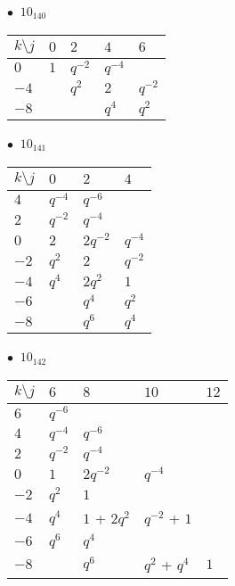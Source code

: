 %
\begin{minipage}{\linewidth}
$\bullet\ $ $10_{140}$ \vspace{0.5em} \\
\begin{tabular}{l|llll}
$k \setminus j$ & $0$ & $2$ & $4$ & $6$ \\
\hline
$0$ & $1$ & $q^{-2}$ & $q^{-4}$ &  \\
$-4$ &  & $q^{2}$ & $2$ & $q^{-2}$ \\
$-8$ &  &  & $q^{4}$ & $q^{2}$ \\
\end{tabular}
\vspace{2em}
\end{minipage}
%
\begin{minipage}{\linewidth}
$\bullet\ $ $10_{141}$ \vspace{0.5em} \\
\begin{tabular}{l|lll}
$k \setminus j$ & $0$ & $2$ & $4$ \\
\hline
$4$ & $q^{-4}$ & $q^{-6}$ &  \\
$2$ & $q^{-2}$ & $q^{-4}$ &  \\
$0$ & $2$ & $2q^{-2}$ & $q^{-4}$ \\
$-2$ & $q^{2}$ & $2$ & $q^{-2}$ \\
$-4$ & $q^{4}$ & $2q^{2}$ & $1$ \\
$-6$ &  & $q^{4}$ & $q^{2}$ \\
$-8$ &  & $q^{6}$ & $q^{4}$ \\
\end{tabular}
\vspace{2em}
\end{minipage}
%
\begin{minipage}{\linewidth}
$\bullet\ $ $10_{142}$ \vspace{0.5em} \\
\begin{tabular}{l|llll}
$k \setminus j$ & $6$ & $8$ & $10$ & $12$ \\
\hline
$6$ & $q^{-6}$ &  &  &  \\
$4$ & $q^{-4}$ & $q^{-6}$ &  &  \\
$2$ & $q^{-2}$ & $q^{-4}$ &  &  \\
$0$ & $1$ & $2q^{-2}$ & $q^{-4}$ &  \\
$-2$ & $q^{2}$ & $1$ &  &  \\
$-4$ & $q^{4}$ & $1$ + $2q^{2}$ & $q^{-2}$ + $1$ &  \\
$-6$ & $q^{6}$ & $q^{4}$ &  &  \\
$-8$ &  & $q^{6}$ & $q^{2}$ + $q^{4}$ & $1$ \\
\end{tabular}
\vspace{2em}
\end{minipage}
